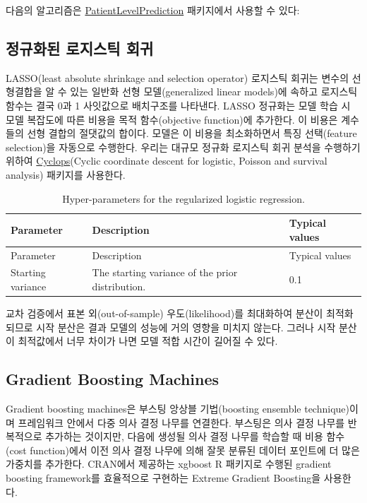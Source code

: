 \documentclass[10.5pt]{book}
\theoremstyle{definition}
\theoremstyle{definition}
\theoremstyle{definition}
\theoremstyle{remark}
\begin{document}
다음의 알고리즘은
\href{https://ohdsi.github.io/PatientLevelPrediction/}{PatientLevelPrediction}
패키지에서 사용할 수 있다:

\subsection{정규화된 로지스틱 회귀}\label{--}

LASSO(least absolute shrinkage and selection operator) 로지스틱 회귀는
변수의 선형결합을 알 수 있는 일반화 선형 모델(generalized linear
models)에 속하고 로지스틱 함수는 결국 0과 1 사잇값으로 배치구조를
나타낸다. LASSO 정규화는 모델 학습 시 모델 복잡도에 따른 비용을 목적
함수(objective function)에 추가한다. 이 비용은 계수들의 선형 결합의
절댓값의 합이다. 모델은 이 비용을 최소화하면서 특징 선택(feature
selection)을 자동으로 수행한다. 우리는 대규모 정규화 로지스틱 회귀
분석을 수행하기 위하여
\href{https://ohdsi.github.io/Cyclops/}{Cyclops}(Cyclic coordinate
descent for logistic, Poisson and survival analysis) 패키지를 사용한다.
  

\begin{longtable}[]{@{}lll@{}}
\caption{\label{tab:lassoParameters} Hyper-parameters for the regularized
logistic regression.}\tabularnewline
\toprule
Parameter & Description & Typical values\tabularnewline
\midrule
\endfirsthead
\toprule
Parameter & Description & Typical values\tabularnewline
\midrule
\endhead
Starting variance & The starting variance of the prior distribution. &
0.1\tabularnewline
\bottomrule
\end{longtable}

교차 검증에서 표본 외(out-of-sample) 우도(likelihood)를 최대화하여
분산이 최적화되므로 시작 분산은 결과 모델의 성능에 거의 영향을 미치지
않는다. 그러나 시작 분산이 최적값에서 너무 차이가 나면 모델 적합 시간이
길어질 수 있다.  

\subsection{Gradient Boosting
Machines}\label{gradient-boosting-machines}

Gradient boosting machines은 부스팅 앙상블 기법(boosting ensemble
technique)이며 프레임워크 안에서 다중 의사 결정 나무를 연결한다.
부스팅은 의사 결정 나무를 반복적으로 추가하는 것이지만, 다음에 생성될
의사 결정 나무를 학습할 때 비용 함수(cost function)에서 이전 의사 결정
나무에 의해 잘못 분류된 데이터 포인트에 더 많은 가중치를 추가한다.
CRAN에서 제공하는 xgboost R 패키지로 수행된 gradient boosting
framework를 효율적으로 구현하는 Extreme Gradient Boosting을 사용한다.
 
\end{document}
